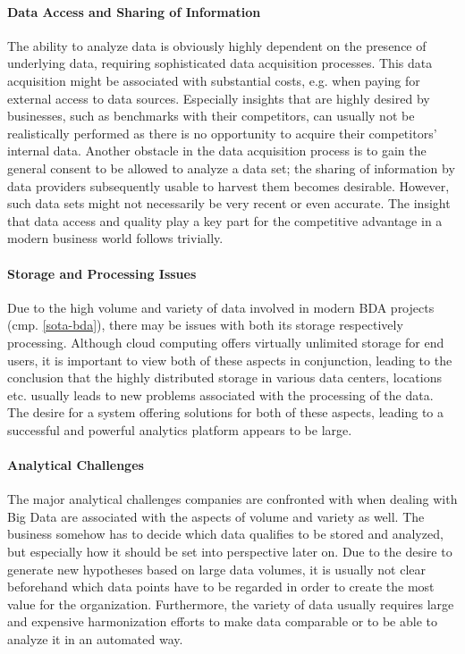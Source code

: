 \paragraph{Data Access and Sharing of Information}
The ability to analyze data is obviously highly dependent on the presence of underlying data, requiring sophisticated data acquisition processes. This data acquisition might be associated with substantial costs, e.g. when paying for external access to data sources. Especially insights that are highly desired by businesses, such as benchmarks with their competitors, can usually not be realistically performed as there is no opportunity to acquire their competitors' internal data. Another obstacle in the data acquisition process is to gain the general consent to be allowed to analyze a data set; the sharing of information by data providers subsequently usable to harvest them becomes desirable. However, such data sets might not necessarily be very recent or even accurate. The insight that data access and quality play a key part for the competitive advantage in a modern business world follows trivially.

\paragraph{Storage and Processing Issues}
Due to the high volume and variety of data involved in modern \ac{BDA} projects (cmp. \autoref{sota-bda}), there may be issues with both its storage respectively processing. Although cloud computing offers virtually unlimited storage for end users, it is important to view both of these aspects in conjunction, leading to the conclusion that the highly distributed storage in various data centers, locations etc. usually leads to new problems associated with the processing of the data. The desire for a system offering solutions for both of these aspects, leading to a successful and powerful analytics platform appears to be large.

\paragraph{Analytical Challenges}
The major analytical challenges companies are confronted with when dealing with Big Data are associated with the aspects of volume and variety as well. The business somehow has to decide which data qualifies to be stored and analyzed, but especially how it should be set into perspective later on. Due to the desire to generate new hypotheses based on large data volumes, it is usually not clear beforehand which data points have to be regarded in order to create the most value for the organization. Furthermore, the variety of data usually requires large and expensive harmonization efforts to make data comparable or to be able to analyze it in an automated way. 

